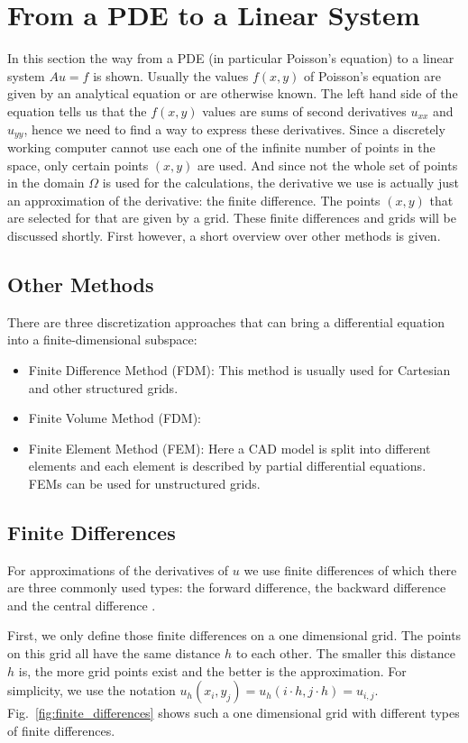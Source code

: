 \section{From a PDE to a Linear System}
In this section the way from a PDE (in particular Poisson's equation) to a linear system $Au = f$ is shown. Usually the values $f(x,y)$ of Poisson's equation are given by an analytical equation or are otherwise known. The left hand side of the equation tells us that the $f(x,y)$ values are sums of second derivatives $u_{xx}$ and $u_{yy}$, hence we need to find a way to express these derivatives. Since a discretely working computer cannot use each one of the infinite number of points in the space, only certain points $(x,y)$ are used. And since not the whole set of points in the domain $\Omega$ is used for the calculations, the derivative we use is actually just an approximation of the derivative: the finite difference. The points $(x,y)$ that are selected for that are given by a grid. These finite differences and grids will be discussed shortly. First however, a short overview over other methods is given.

\subsection{Other Methods}
There are three discretization approaches that can bring a differential equation into a finite-dimensional subspace:
\begin{itemize}
\item Finite Difference Method (FDM): This method is usually used for Cartesian and other structured grids.
\item Finite Volume Method (FDM): 
\item Finite Element Method (FEM): Here a CAD model is split into different elements and each element is described by partial differential equations. FEMs can be used for unstructured grids. 
\end{itemize}

\subsection{Finite Differences}
 For approximations of the  derivatives of $u$ we use finite differences of which there are three commonly used types: the forward difference, the backward difference and the central difference \cite{langer}. 

First, we only define those finite differences on a one dimensional grid. The points on this grid all have the same distance $h$ to each other. The smaller this distance $h$ is, the more grid points exist and the better is the approximation. For simplicity, we use the notation $u_h(x_i, y_j) = u_h(i\cdot h,j\cdot h) = u_{i,j}$. Fig.~\ref{fig:finite_differences} shows such a one dimensional grid with different types of finite differences.


